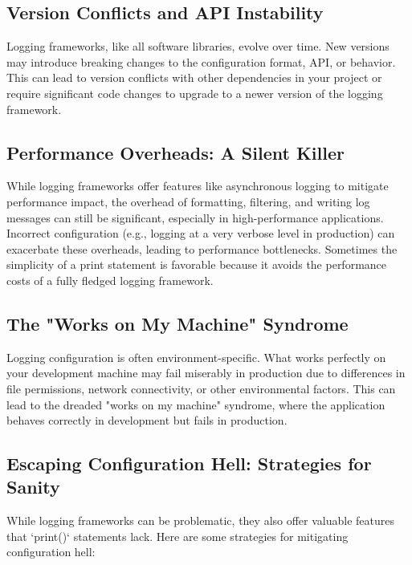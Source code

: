 \documentclass{article}
\begin{document}
{{{{\subsection*{Version Conflicts and API Instability}

Logging frameworks, like all software libraries, evolve over time. New versions may introduce breaking changes to the configuration format, API, or behavior. This can lead to version conflicts with other dependencies in your project or require significant code changes to upgrade to a newer version of the logging framework.

\subsection*{Performance Overheads: A Silent Killer}

While logging frameworks offer features like asynchronous logging to mitigate performance impact, the overhead of formatting, filtering, and writing log messages can still be significant, especially in high-performance applications. Incorrect configuration (e.g., logging at a very verbose level in production) can exacerbate these overheads, leading to performance bottlenecks. Sometimes the simplicity of a print statement is favorable because it avoids the performance costs of a fully fledged logging framework.

\subsection*{The "Works on My Machine" Syndrome}

Logging configuration is often environment-specific.  What works perfectly on your development machine may fail miserably in production due to differences in file permissions, network connectivity, or other environmental factors. This can lead to the dreaded "works on my machine" syndrome, where the application behaves correctly in development but fails in production.

\subsection*{Escaping Configuration Hell: Strategies for Sanity}

While logging frameworks can be problematic, they also offer valuable features that `print()` statements lack.  Here are some strategies for mitigating configuration hell:

}}}}
\end{document}
